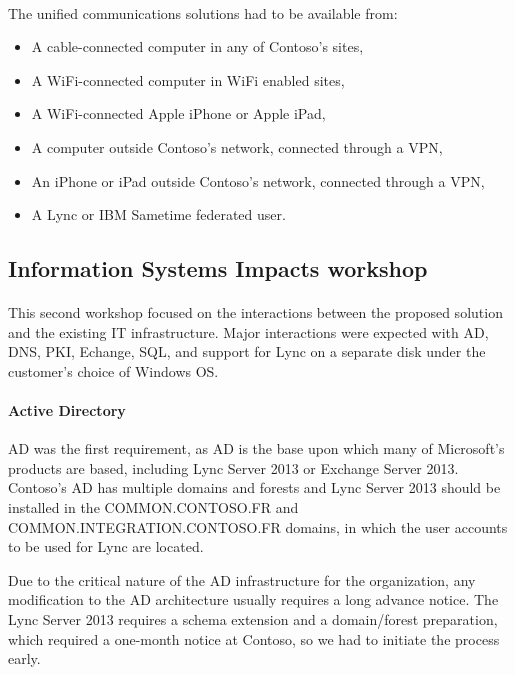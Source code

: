 	\paragraph{}
		The unified communications solutions had to be available from:
		\begin{itemize}
		\item A cable-connected computer in any of Contoso's sites,
		\item A WiFi-connected computer in WiFi enabled sites,
		\item A WiFi-connected Apple iPhone or Apple iPad,
		\item A computer outside Contoso's network, connected through a VPN,
		\item An iPhone or iPad outside Contoso's network, connected through a VPN,
		\item A Lync or IBM Sametime federated user.
		\end{itemize}


\subsection{Information Systems Impacts workshop}
	\paragraph{}
	This second workshop focused on the interactions between the proposed solution and the existing IT infrastructure. Major interactions were expected with AD, DNS, PKI, Echange, SQL, and support for Lync on a separate disk under the customer's choice of Windows OS.

	\paragraph{Active Directory}
	AD was the first requirement, as AD is the base upon which many of Microsoft's products are based, including Lync Server 2013 or Exchange Server 2013. 
	Contoso's AD has multiple domains and forests and Lync Server 2013 should be installed in the COMMON.CONTOSO.FR and \linebreak COMMON.INTEGRATION.CONTOSO.FR domains, in which the user accounts to be used for Lync are located.

	Due to the critical nature of the AD infrastructure for the organization, any modification to the AD architecture usually requires a long advance notice. The Lync Server 2013 requires a schema extension and a domain/forest preparation, which required a one-month notice at Contoso, so we had to initiate the process early.

